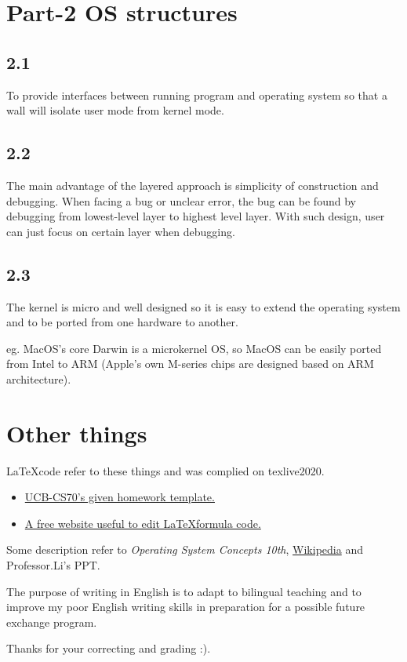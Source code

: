 \documentclass[11pt]{article}
\begin{document}
\section*{Part-2 OS structures}
   
\subsection*{2.1}
To provide interfaces between running program and operating system so that a wall will isolate user mode from kernel mode. 

\subsection*{2.2}
The main advantage of the layered approach is simplicity of construction and debugging. When facing a bug or unclear error, 
the bug can be found by debugging from lowest-level layer to highest level layer. With such design, user can just focus on certain
layer when debugging.

\subsection*{2.3}
The kernel is micro and well designed so it is easy to extend the operating system and to be ported from one hardware to another.

eg. MacOS's core Darwin is a microkernel OS, so MacOS can be easily ported from Intel to ARM
(Apple's own M-series chips are designed based on ARM architecture).

\section*{Other things}

\LaTeX \space code refer to these things and was complied on texlive2020.
\begin{itemize}
    \item  \href{https://www.eecs70.org/assets/misc/homework_template.tex}{UCB-CS70's given homework template.} 
    \item  \href{https://www.latexlive.com}{A free website useful to edit \LaTeX \space formula code.}
\end{itemize}

Some description refer to \textit{Operating System Concepts 10th}, \href{https://en.wikipedia.org}{Wikipedia} and Professor.Li's PPT.

The purpose of writing in English is to adapt to bilingual teaching and to improve my poor English 
writing skills in preparation for a possible future exchange program. 

Thanks for your correcting and grading :).
\end{document}
